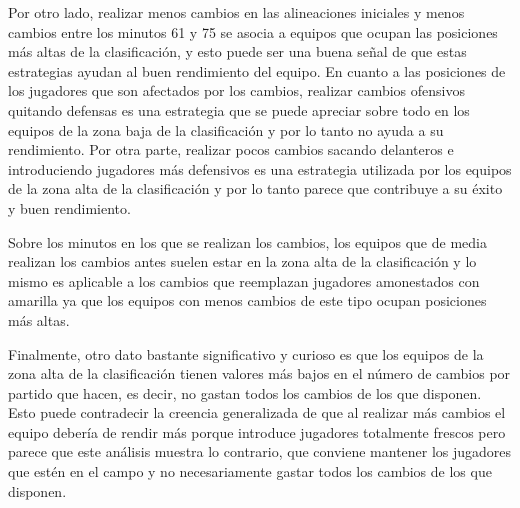 Por otro lado, realizar menos cambios en las alineaciones iniciales y menos cambios entre los 
minutos 61 y 75 se asocia a equipos que ocupan las posiciones más altas de la clasificación, y esto 
puede ser una buena señal de que estas estrategias ayudan al buen rendimiento del equipo.
En cuanto a las posiciones de los jugadores que son afectados por los cambios, realizar cambios 
ofensivos quitando defensas es una estrategia que se puede apreciar sobre todo en los equipos de 
la zona baja de la clasificación y por lo tanto no ayuda a su rendimiento. Por otra parte, realizar 
pocos cambios sacando delanteros e introduciendo jugadores más defensivos es una estrategia 
utilizada por los equipos de la zona alta de la clasificación y por lo tanto parece que contribuye a 
su éxito y buen rendimiento.

Sobre los minutos en los que se realizan los cambios, los equipos que de media realizan los 
cambios antes suelen estar en la zona alta de la clasificación y lo mismo es aplicable a los cambios 
que reemplazan jugadores amonestados con amarilla ya que los equipos con menos cambios de 
este tipo ocupan posiciones más altas.

Finalmente, otro dato bastante significativo y curioso es que los equipos de la zona alta de la 
clasificación tienen valores más bajos en el número de cambios por partido que hacen, es decir, 
no gastan todos los cambios de los que disponen. Esto puede contradecir la creencia generalizada 
de que al realizar más cambios el equipo debería de rendir más porque introduce jugadores 
totalmente frescos pero parece que este análisis muestra lo contrario, que conviene mantener los 
jugadores que estén en el campo y no necesariamente gastar todos los cambios de los que 
disponen.